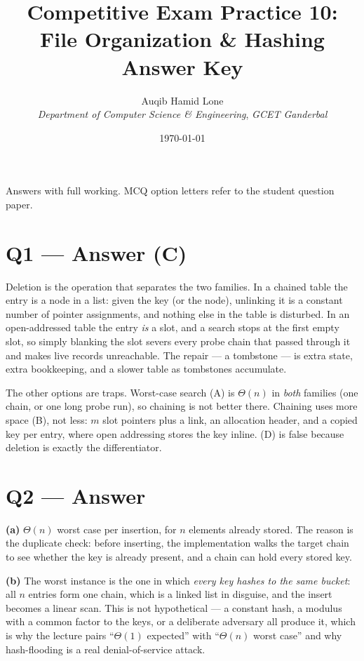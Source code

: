 \documentclass[11pt]{article}
\title{Competitive Exam Practice 10: File Organization \& Hashing\\\large Answer Key}
\author{Auqib Hamid Lone\\[0.3em]
  \emph{Department of Computer Science \& Engineering}, \emph{GCET Ganderbal}}
\date{\today}
\begin{document}
\maketitle

\noindent Answers with full working. MCQ option letters refer to the student question paper.

\section*{Q1 --- Answer (C)}

Deletion is the operation that separates the two families. In a chained table the entry is a node in a list: given the key (or the node), unlinking it is a constant number of pointer assignments, and nothing else in the table is disturbed. In an open-addressed table the entry \emph{is} a slot, and a search stops at the first empty slot, so simply blanking the slot severs every probe chain that passed through it and makes live records unreachable. The repair --- a tombstone --- is extra state, extra bookkeeping, and a slower table as tombstones accumulate.

The other options are traps. Worst-case search (A) is $\Theta(n)$ in \emph{both} families (one chain, or one long probe run), so chaining is not better there. Chaining uses more space (B), not less: $m$ slot pointers plus a link, an allocation header, and a copied key per entry, where open addressing stores the key inline. (D) is false because deletion is exactly the differentiator.

\section*{Q2 --- Answer}

\textbf{(a)} $\Theta(n)$ worst case per insertion, for $n$ elements already stored. The reason is the duplicate check: before inserting, the implementation walks the target chain to see whether the key is already present, and a chain can hold every stored key. 

\textbf{(b)} The worst instance is the one in which \emph{every key hashes to the same bucket}: all $n$ entries form one chain, which is a linked list in disguise, and the insert becomes a linear scan. This is not hypothetical --- a constant hash, a modulus with a common factor to the keys, or a deliberate adversary all produce it, which is why the lecture pairs ``$\Theta(1)$ expected'' with ``$\Theta(n)$ worst case'' and why hash-flooding is a real denial-of-service attack.
\end{document}

